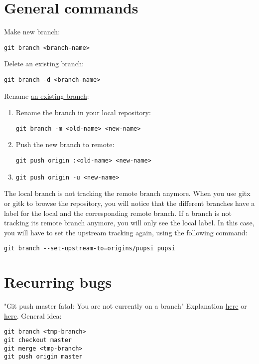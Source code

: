 \documentclass{report}
\begin{document}
\section{General commands}

Make new branch:
\begin{verbatim}
git branch <branch-name>
\end{verbatim}

Delete an existing branch:
\begin{verbatim}
git branch -d <branch-name>
\end{verbatim}

Rename \href{https://multiplestates.wordpress.com/2015/02/05/rename-a-local-and-remote-branch-in-git/}{an existing branch}:
\begin{enumerate}[noitemsep]
    \item Rename the branch in your local repository:
    \begin{verbatim}
git branch -m <old-name> <new-name>
    \end{verbatim}
    \item Push the new branch to remote:
    \begin{verbatim}
git push origin :<old-name> <new-name>
    \end{verbatim}
    \item 
    \begin{verbatim}
git push origin -u <new-name>
    \end{verbatim}
\end{enumerate}

The local branch is not tracking the remote branch anymore. When you use gitx or gitk to browse the repository, you will notice that the different branches have a label for the local and the corresponding remote branch. If a branch is not tracking its remote branch anymore, you will only see the local label. In this case, you will have to set the upstream tracking again, using the following command:
\begin{verbatim}
git branch --set-upstream-to=origins/pupsi pupsi
\end{verbatim}

\section{Recurring bugs}

"Git push master fatal: You are not currently on a branch"
Explanation \href{https://stackoverflow.com/questions/30471557/git-push-master-fatal-you-are-not-currently-on-a-branch/30471627}{here} or \href{https://stackoverflow.com/questions/4735556/git-not-currently-on-any-branch-is-there-an-easy-way-to-get-back-on-a-branch}{here}.
General idea:
\begin{verbatim}
git branch <tmp-branch>
git checkout master
git merge <tmp-branch>
git push origin master
\end{verbatim}
\end{document}
